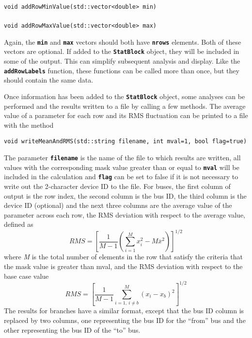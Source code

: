 \documentclass[12pt]{report} %
\begin{document}
{
\color{red}
\begin{Verbatim}[fontseries=b]
void addRowMinValue(std::vector<double> min)

void addRowMaxValue(std::vector<double> max)
\end{Verbatim}
}

Again, the \texttt{\textbf{min}} and \texttt{\textbf{max}} vectors should both have \texttt{\textbf{nrows}} elements. Both of these vectors are optional. If added to the \texttt{\textbf{StatBlock}} object, they will be included in some of the output. This can simplify subsequent analysis and display. Like the \texttt{\textbf{addRowLabels}} function, these functions can be called more than once, but they should contain the same data.

Once information has been added to the \texttt{\textbf{StatBlock}} object, some analyses can be performed and the results written to a file by calling a few methods. The average value of a parameter for each row and its RMS fluctuation can be printed to a file with the method

{
\color{red}
\begin{Verbatim}[fontseries=b]
void writeMeanAndRMS(std::string filename, int mval=1, bool flag=true)
\end{Verbatim}
}

The parameter \texttt{\textbf{filename}} is the name of the file to which results are written, all values with the corresponding mask value greater than or equal to \texttt{\textbf{mval}} will be included in the calculation and \texttt{\textbf{flag}} can be set to false if it is not necessary to write out the 2-character device ID to the file. For buses, the first column of output is the row index, the second column is the bus ID, the third column is the device ID (optional) and the next three columns are the average value of the parameter across each row, the RMS deviation with respect to the average value, defined as\[RMS={\left[\frac{1}{M-1}\left(\sum^M_{i=1}{x^2_i-M{\overline{x}}^2}\right)\right]}^{1/2}\] 
where \textit{M} is the total number of elements in the row that satisfy the criteria that the mask value is greater than mval, and the RMS deviation with respect to the base case value
\[RMS={\left[\frac{1}{M-1}\sum^M_{i=1,\ i\neq b}{{\left(x_i-x_b\right)}^2}\right]}^{1/2}\] 
The results for branches have a similar format, except that the bus ID column is replaced by two columns, one representing the bus ID for the ``from'' bus and the other representing the bus ID of the ``to'' bus.
\end{document}

